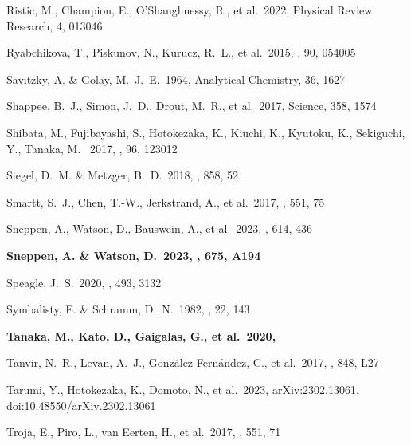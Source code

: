 \documentclass[twocolumn,twocolappendix]{aastex63}
\begin{document}
{{\begin{thebibliography}{}
 Ristic, M., Champion, E., O'Shaughnessy, R., et al.\ 2022, Physical Review Research, 4, 013046


 Ryabchikova, T., Piskunov, N., Kurucz, R.~L., et al.\ 2015, \physscr, 90, 054005


 Savitzky, A. \& Golay, M.~J.~E.\ 1964, Analytical Chemistry, 36, 1627


 Shappee, B.~J., Simon, J.~D., Drout, M.~R., et al.\ 2017, Science, 358, 1574


 Shibata, M., Fujibayashi, S., Hotokezaka, K., Kiuchi, K., Kyutoku, K., Sekiguchi, Y., Tanaka, M. \ 2017, \prd, 96, 123012


 Siegel, D.~M. \& Metzger, B.~D.\ 2018, \apj, 858, 52


 Smartt, S.~J., Chen, T.-W., Jerkstrand, A., et al.\ 2017, \nat, 551, 75


 Sneppen, A., Watson, D., Bauswein, A., et al.\ 2023, \nat, 614, 436


 \textbf{Sneppen, A. \& Watson, D.\ 2023, \aap, 675, A194}


 Speagle, J.~S.\ 2020, \mnras, 493, 3132

 Symbalisty, E. \& Schramm, D.~N.\ 1982, \aplett, 22, 143


 \textbf{Tanaka, M., Kato, D., Gaigalas, G., et al.\ 2020, \mnras}


 Tanvir, N.~R., Levan, A.~J., Gonz{\'a}lez-Fern{\'a}ndez, C., et al.\ 2017, \apjl, 848, L27


 Tarumi, Y., Hotokezaka, K., Domoto, N., et al.\ 2023, arXiv:2302.13061. doi:10.48550/arXiv.2302.13061


 Troja, E., Piro, L., van Eerten, H., et al.\ 2017, \nat, 551, 71



\end{thebibliography}}}
\end{document}
